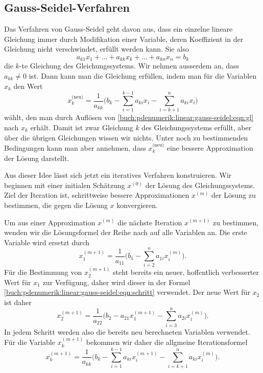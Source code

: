 \subsection{Gauss-Seidel-Verfahren
\label{buch:pdenumerik:linear:subsection:gauss-seidel}}
Das Verfahren von Gauss-Seidel geht davon aus, dass ein einzelne lineare
%
Gleichung immer durch Modifikation einer Variable, deren Koeffizient in
der Gleichung nicht verschwindet, erfüllt werden kann.
Sie also
\begin{equation}
a_{k1}x_1 + \dots + a_{kk}x_k + \dots + a_{kn}x_n = b_k
\label{buch:pdenumerik:linear:gauss-seidel:eqn:gl}
\end{equation}
die $k$-te Gleichung des Gleichungssystems.
Wir nehmen ausserdem an, dass $a_{kk}\ne 0$ ist.
Dann kann man die Gleichung erfüllen, indem man für die Variablen $x_k$
den Wert
\begin{equation}
x_k^{\text{(neu)}}
=
\frac{1}{a_{kk}}
\biggl(
b_k
-
\sum_{i=1}^{k-1}a_{ki}x_i
-
\sum_{i=k+1}^na_{ki}x_i
\biggr)
\label{buch:pdenumerik:linear:gauss-seidel:eqn:schritt}
\end{equation}
wählt, den man durch Auflösen von
\eqref{buch:pdenumerik:linear:gauss-seidel:eqn:gl}
nach $x_k$ erhält.
Damit ist zwar Gleichung $k$ des Gleichungssystems erfüllt, aber über die
übrigen Gleichungen wissen wir nichts.
Unter noch zu bestimmenden Bedingungen kann man aber annehmen, dass 
$x_k^{\text{(neu)}}$ eine bessere Approximation der Lösung darstellt.

Aus dieser Idee lässt sich jetzt ein iteratives Verfahren konstruieren.
Wir beginnen mit einer initialen Schätzung $x^{(0)}$ der Lösung des
Gleichungssystems.
Ziel der Iteration ist, schrittweise bessere Approximationen $x^{(m)}$
der Lösung zu bestimmen, die gegen die Lösung $x$ konvergieren.

Um aus einer Approximation $x^{(m)}$ die nächste Iteration $x^{(m+1)}$
zu bestimmen, wenden wir die Lösungsformel der Reihe nach auf alle
Variablen an.
Die erste Variable wird ersetzt durch
\[
x_1^{(m+1)}
=
\frac{1}{a_{11}}
\biggl(
b_1
-
\sum_{i=2}^n a_{1i}x_i^{(m)}
\biggr).
\]
Für die Bestimmung von $x_2^{(m+1)}$ steht bereits ein neuer,
hoffentlich verbesserter Wert für $x_1$ zur Verfügung, daher wird
dieser in der Formel \eqref{buch:pdenumerik:linear:gauss-seidel:eqn:schritt}
verwendet.
Der neue Wert für $x_2$ ist daher
\begin{equation}
x_2^{(m+1)}
=
\frac{1}{a_{22}}
\biggl(
b_2 - a_{21}x_1^{(m+1)}
-
\sum_{i=3}^n a_{2i}x_i^{(m)}
\biggr).
\end{equation}
In jedem Schritt werden also die bereits neu berechneten Variablen
verwendet.
Für die Variable $x_k^{(m+1)}$ bekommen wir daher die allgmeine
Iterationsformel
\begin{equation}
x_k^{(m+1)}
=
\frac{1}{a_{kk}}
\biggl(
b_k - \sum_{i=1}^{k-1} a_{ki}x_i^{(m+1)} - \sum_{i=k+1}^n a_{ki}x_i^{(m)}
\biggr).
\label{buch:pdenumerik:linear:gauss-seidel:iteration}
\end{equation}

